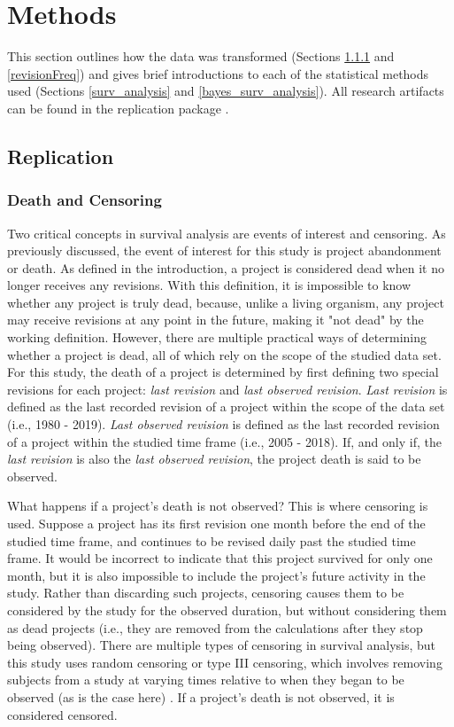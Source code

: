 \documentclass[sigconf]{acmart}
\begin{document}
\section{Methods} \label{methods}

This section outlines how the data was transformed (Sections \ref{death_censoring} and \ref{revisionFreq}) and gives brief introductions to each of the statistical methods used (Sections \ref{surv_analysis} and \ref{bayes_surv_analysis}). 
All research artifacts can be found in the replication package \cite{repl-package}.

\subsection{Replication} \label{replmethods}
\subsubsection{Death and Censoring} \label{death_censoring}

Two critical concepts in survival analysis are events of interest and censoring.
As previously discussed, the event of interest for this study is project abandonment or death.
As defined in the introduction, a project is considered dead when it no longer receives any revisions.
With this definition, it is impossible to know whether any project is truly dead, because, unlike a living organism, any project may receive revisions at any point in the future, making it "not dead" by the working definition.
However, there are multiple practical ways of determining whether a project is dead, all of which rely on the scope of the studied data set.
For this study, the death of a project is determined by first defining two special revisions for each project: \emph{last revision} and \emph{last observed revision}. 
\emph{Last revision} is defined as the last recorded revision of a project within the scope of the data set (i.e., 1980 - 2019). 
\emph{Last observed revision} is defined as the last recorded revision of a project within the studied time frame (i.e., 2005 - 2018). 
If, and only if, the \emph{last revision} is also the \emph{last observed revision}, the project death is said to be observed. 

What happens if a project's death is not observed?
This is where censoring is used.
Suppose a project has its first revision one month before the end of the studied time frame, and continues to be revised daily past the studied time frame.
It would be incorrect to indicate that this project survived for only one month, but it is also impossible to include the project's future activity in the study.
Rather than discarding such projects, censoring causes them to be considered by the study for the observed duration, but without considering them as dead projects (i.e., they are removed from the calculations after they stop being observed).
There are multiple types of censoring in survival analysis, but this study uses random censoring or type III censoring, which involves removing subjects from a study at varying times relative to when they began to be observed (as is the case here) \cite{renganathan2016overview}. If a project's death is not observed, it is considered censored.
\end{document}
